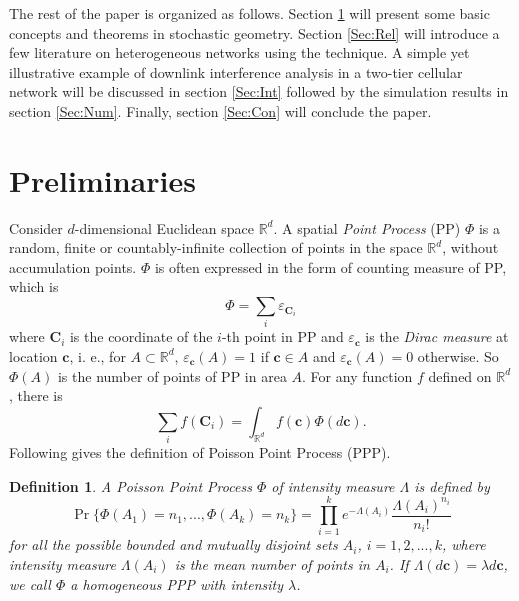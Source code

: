 \documentclass[a4paper,twocolumn]{IEEEtran}
\newtheorem{definition}{\textbf{Definition}}
\begin{document}
The rest of the paper is organized as follows. Section \ref{Sec:Preli} will present some basic concepts and theorems in stochastic geometry. Section \ref{Sec:Rel} will introduce a few literature on heterogeneous networks using the technique. A simple yet illustrative example of downlink interference analysis in a two-tier cellular network will be discussed in section \ref{Sec:Int} followed by the simulation results in section \ref{Sec:Num}. Finally, section \ref{Sec:Con} will conclude the paper.           
\section{Preliminaries}\label{Sec:Preli}
Consider $d$-dimensional Euclidean space $\mathbb{R}^d$. A spatial \emph{Point Process} (PP) $\Phi$ is a random, finite or countably-infinite collection of points in the space $\mathbb{R}^d$, without accumulation points. $\Phi$ is often expressed in the form of counting measure of PP, which is
\begin{displaymath}
\Phi = \sum_i \varepsilon_{\bm{C}_i}
\end{displaymath} 
where $\bm{C}_i$ is the coordinate of the $i$-th point in PP and $\varepsilon_{\bm{c}}$ is the \emph{Dirac measure} at location $\bm{c}$, i. e., for $A \subset \mathbb{R}^d$, $\varepsilon_{\bm{c}}(A)=1$ if $\bm{c} \in A$ and $\varepsilon_{\bm{c}}(A)=0$ otherwise. So $\Phi(A)$ is the number of points of PP in area $A$. For any function $f$ defined on $\mathbb{R}^d$, there is   
\begin{displaymath}
\sum_i f(\bm{C}_i) = \int_{\mathbb{R}^d}f(\bm{c})\Phi(d\bm{c}).
\end{displaymath}
Following gives the definition of Poisson Point Process (PPP).
\begin{definition}
A Poisson Point Process $\Phi$ of intensity measure $\Lambda$ is defined by
\begin{equation}
\Pr\{\Phi(A_1) = n_1, ..., \Phi(A_k) = n_k\} = \prod_{i=1}^{k} e^{-\Lambda(A_i)}\frac{\Lambda(A_i)^{n_i}}{n_i !}
\end{equation}
for all the possible bounded and mutually disjoint sets $A_i$, $i = 1,2, ..., k$, where intensity measure $\Lambda(A_i)$ is the mean number of points in $A_i$. If $\Lambda(d\bm{c}) = \lambda d\bm{c}$, we call $\Phi$ a homogeneous PPP with intensity $\lambda$.  
\end{definition}
\end{document}
